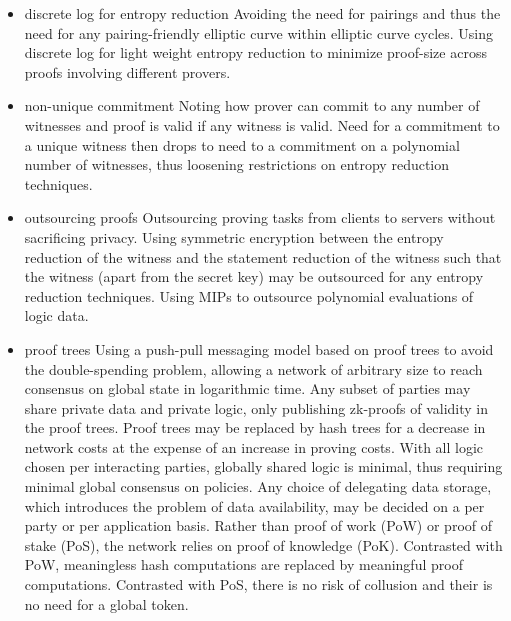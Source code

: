 \begin{itemize}
    \item{discrete log for entropy reduction}
    Avoiding the need for pairings and thus the need for any pairing-friendly elliptic curve within elliptic curve cycles.
    Using discrete log for light weight entropy reduction to minimize proof-size across proofs involving different provers.

    \item{non-unique commitment}
    Noting how prover can commit to any number of witnesses and proof is valid if any witness is valid.
    Need for a commitment to a unique witness then drops to need to a commitment on a polynomial number of witnesses, thus loosening restrictions on entropy reduction techniques.

    \item{outsourcing proofs}
    Outsourcing proving tasks from clients to servers without sacrificing privacy. 
    Using symmetric encryption between the entropy reduction of the witness and the statement reduction of the witness such that the witness (apart from the secret key) may be outsourced for any entropy reduction techniques.
    Using MIPs to outsource polynomial evaluations of logic data.

    \item{proof trees}
    Using a push-pull messaging model based on proof trees to avoid the double-spending problem, allowing a network of arbitrary size to reach consensus on global state in logarithmic time.
    Any subset of parties may share private data and private logic, only publishing zk-proofs of validity in the proof trees.
    Proof trees may be replaced by hash trees for a decrease in network costs at the expense of an increase in proving costs.
    With all logic chosen per interacting parties, globally shared logic is minimal, thus requiring minimal global consensus on policies.
    Any choice of delegating data storage, which introduces the problem of data availability, may be decided on a per party or per application basis. 
    Rather than proof of work (PoW) or proof of stake (PoS), the network relies on proof of knowledge (PoK).
    Contrasted with PoW, meaningless hash computations are replaced by meaningful proof computations.
    Contrasted with PoS, there is no risk of collusion and their is no need for a global token.

\end{itemize}

